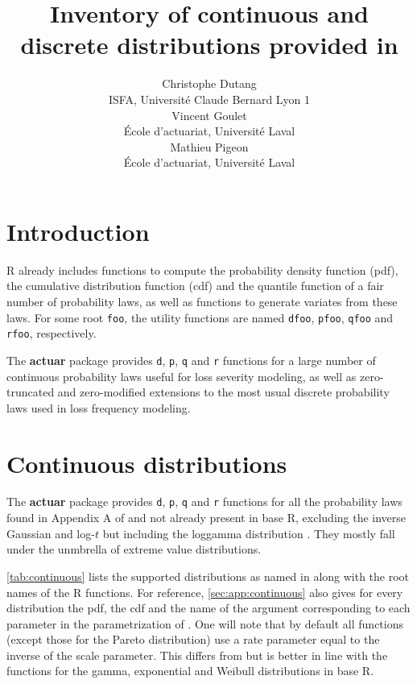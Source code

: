 \documentclass[x11names]{article}
\title{Inventory of continuous and discrete distributions provided
    in \pkg{actuar}}
\author{Christophe Dutang \\ ISFA, Université Claude Bernard Lyon 1 \\[3ex]
    Vincent Goulet \\ École d'actuariat, Université Laval \\[3ex]
    Mathieu Pigeon \\ École d'actuariat, Université Laval}
\date{}
\newcommand{\proglang}[1]{\textsf{#1}}
\newcommand{\pkg}[1]{\textbf{#1}}
\newcommand{\code}[1]{\texttt{#1}}
\begin{document}
\maketitle

\section{Introduction}
\label{sec:introduction}

\proglang{R} already includes functions to compute the probability
density function (pdf), the cumulative distribution function (cdf) and
the quantile function of a fair number of probability laws, as well as
functions to generate variates from these laws. For some root
\code{foo}, the utility functions are named \code{dfoo}, \code{pfoo},
\code{qfoo} and \code{rfoo}, respectively.

The \pkg{actuar} package provides \code{d}, \code{p}, \code{q} and
\code{r} functions for a large number of continuous probability laws
useful for loss severity modeling, as well as zero-truncated and
zero-modified extensions to the most usual discrete probability laws
used in loss frequency modeling.


\section{Continuous distributions}
\label{sec:continuous}

The \pkg{actuar} package provides \code{d}, \code{p}, \code{q} and
\code{r} functions for all the probability laws found in Appendix A of
\cite{LossModels4e} and not already present in base \proglang{R},
excluding the inverse Gaussian and log-$t$ but including the loggamma
distribution \citep{HoggKlugman}. They mostly fall under the unmbrella
of extreme value distributions.

\autoref{tab:continuous} lists the supported distributions as
named in \cite{LossModels4e} along with the root names of the
\proglang{R} functions. For reference, \autoref{sec:app:continuous}
also gives for every distribution the pdf, the cdf and the name of the
argument corresponding to each parameter in the parametrization of
\cite{LossModels4e}. One will note that by default all functions
(except those for the Pareto distribution) use a rate parameter equal
to the inverse of the scale parameter. This differs from
\cite{LossModels4e} but is better in line with the functions for the
gamma, exponential and Weibull distributions in base \proglang{R}.
\end{document}
